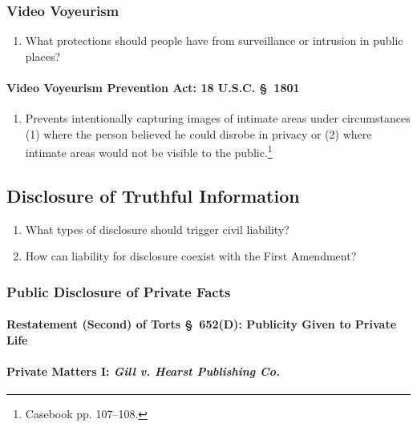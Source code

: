 \subsubsection{Video Voyeurism}

\begin{enumerate}
    \item What protections should people have from surveillance or intrusion in 
    public places?
\end{enumerate}

\paragraph{Video Voyeurism Prevention Act: 18 U.S.C. \S\ 1801}

\begin{enumerate}
    \item Prevents intentionally capturing images of intimate areas under 
    circumstances (1) where the person believed he could disrobe in privacy or 
    (2) where intimate areas would not be visible to the 
    public.\footnote{Casebook pp. 107--108.}
\end{enumerate}

\subsection{Disclosure of Truthful Information}

\begin{enumerate}
    \item What types of disclosure should trigger civil liability?
    \item How can liability for disclosure coexist with the First Amendment?
\end{enumerate}

\subsubsection{Public Disclosure of Private Facts}

\paragraph{Restatement (Second) of Torts \S\ 652(D): Publicity Given to Private 
Life}


\paragraph{Private Matters I: \emph{Gill v. Hearst Publishing Co.}}

